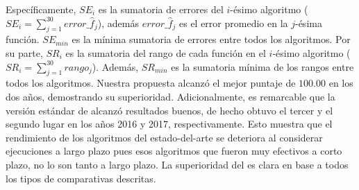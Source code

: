 Específicamente, $SE_i$ es la sumatoria de errores del $i$-ésimo algoritmo ($SE_i = \sum_{j=1}^{30} error\_\hat{f}_j$), además $error\_\hat{f}_j$ es el error promedio en la $j$-ésima función.
%
$SE_{min}$ es la mínima sumatoria de errores entre todos los algoritmos.
%
Por su parte, $SR_i$ es la sumatoria del rango de cada función en el $i$-ésimo algoritmo ($SR_i = \sum_{j=1}^{30} rango_j$). %
%
Además, $SR_{min}$ es la sumatoria mínima de los rangos entre todos los algoritmos. %
%
Nuestra propuesta alcanzó el mejor puntaje de $100.00$ en los dos años, demostrando su superioridad. 
%
Adicionalmente, es remarcable que la versión estándar de \DE{} alcanzó resultados buenos, de hecho obtuvo el tercer y el segundo lugar en los años 2016 y 2017, respectivamente.
%
Esto muestra que el rendimiento de los algoritmos del estado-del-arte se deteriora al considerar 
ejecuciones a largo plazo pues esos algoritmos que fueron muy efectivos a corto plazo,
no lo son tanto a largo plazo.
%
%
%
La superioridad del \DEEDM{} es clara en base a todos los tipos de comparativas descritas.

